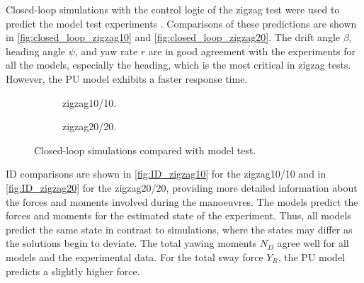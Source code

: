 Closed-loop simulations with the control logic of the zigzag test were used to predict the model test experiments \citep{alexandersson_system_2022,alexandersson_wpcc_2024}. Comparisons of these predictions are shown in \autoref{fig:closed_loop_zigzag10} and \autoref{fig:closed_loop_zigzag20}. The drift angle $\beta$, heading angle $\psi$, and yaw rate $r$ are in good agreement with the experiments for all the models, especially the heading, which is the most critical in zigzag tests. However, the PU model exhibits a faster response time.

\begin{figure}
    \centering
    \begin{subfigure}[b]{0.49\textwidth}
        \centering
        
        \caption{zigzag10/10.}
        \label{fig:closed_loop_zigzag10}
    \end{subfigure}
    \hfill
    \begin{subfigure}[b]{0.49\textwidth}
        \centering
        
        \caption{zigzag20/20.}
        \label{fig:closed_loop_zigzag20}
    \end{subfigure}
    \caption{Closed-loop simulations compared with model test.}
    \label{fig:closed_loop}
\end{figure}
%    
%    
ID comparisons are shown in \autoref{fig:ID_zigzag10} for the zigzag10/10 and in \autoref{fig:ID_zigzag20} for the zigzag20/20, providing more detailed information about the forces and moments involved during the manoeuvres. The models predict the forces and moments for the estimated state of the experiment. Thus, all models predict the same state in contrast to simulations, where the states may differ as the solutions begin to deviate.    
The total yawing moments $N_D$ agree well for all models and the experimental data. For the total sway force $Y_R$, the PU model predicts a slightly higher force.  

